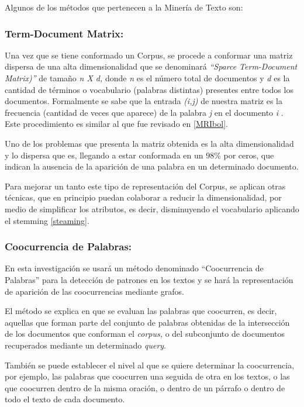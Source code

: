 \documentclass[
  10,
  openany]{book}
\begin{document}
Algunos de los métodos que pertenecen a la Minería de Texto son:

\hypertarget{term-document-matrix}{%
\subsubsection{Term-Document Matrix:}\label{term-document-matrix}}

Una vez que se tiene conformado un Corpus, se procede a conformar una matriz dispersa de una alta dimensionalidad que se denominará \emph{``Sparce Term-Document Matrix)''} de tamaño \emph{n X d,} donde \emph{n} es el número total de documentos y \emph{d} es la cantidad de términos o vocabulario (palabras distintas) presentes entre todos los documentos. Formalmente se sabe que la entrada \emph{(i,j)} de nuestra matriz es la frecuencia (cantidad de veces que aparece) de la palabra \emph{j} en el documento \emph{i} . Este procedimiento es similar al que fue revisado en \ref{MRIbol}.

Uno de los problemas que presenta la matriz obtenida es la alta dimensionalidad y lo dispersa que es, llegando a estar conformada en un 98\% por ceros, que indican la ausencia de la aparición de una palabra en un determinado documento.

Para mejorar un tanto este tipo de representación del Corpus, se aplican otras técnicas, que en principio puedan colaborar a reducir la dimensionalidad, por medio de simplificar los atributos, es decir, disminuyendo el vocabulario aplicando el stemming \ref{steaming}.

\hypertarget{coocurrencia}{%
\subsubsection{Coocurrencia de Palabras:}\label{coocurrencia}}

En esta investigación se usará un método denominado ``Coocurrencia de Palabras'' para la detección de patrones en los textos y se hará la representación de aparición de las coocurrencias mediante grafos.

El método se explica en que se evaluan las palabras que coocurren, es decir, aquellas que forman parte del conjunto de palabras obtenidas de la intersección de los documentos que conforman el \emph{corpus,} o del subconjunto de documentos recuperados mediante un determinado \emph{query}.

También se puede establecer el nivel al que se quiere determinar la coocurrencia, por ejemplo, las palabras que coocurren una seguida de otra en los textos, o las que coocurren dentro de la misma oración, o dentro de un párrafo o dentro de todo el texto de cada documento.
\end{document}
